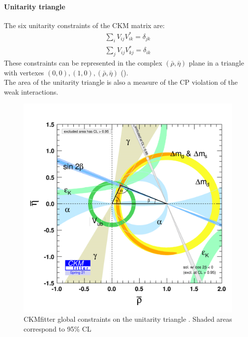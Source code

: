 \paragraph*{Unitarity triangle}
The six unitarity constraints of the CKM matrix are:
\begin{gather}
    \sum_i V_{ij}V_{ik}^*=\delta_{jk}\\
    \sum_j V_{ij}V_{kj}^*=\delta_{ik}
\end{gather}
These constraints can be represented in the complex $(\bar{\rho},\bar{\eta})$ plane in a triangle with vertexes $(0,0), (1,0), (\bar{\rho},\bar{\eta})$ ().\\
The area of the unitarity triangle is also a measure of the CP violation of the weak interactions.
\begin{figure}[h]
    \centering
    \includegraphics[width=0.85\linewidth]{fig//chap02-theory/triangle.png}
    \caption{CKMfitter global constraints on the unitarity triangle \cite{CKMfitter}. Shaded areas correspond to 95\% CL}
    \label{fig:triangle}
\end{figure}


